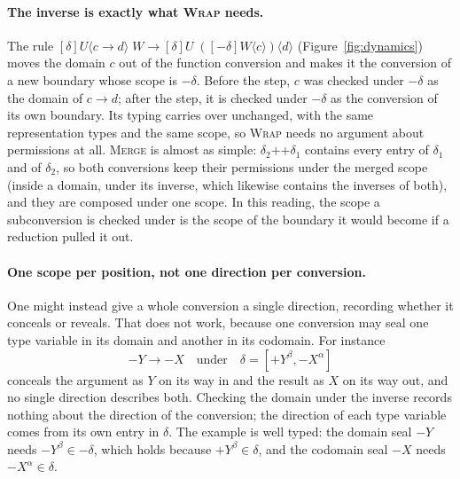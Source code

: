 \documentclass[acmsmall,screen,review,anonymous,nonacm]{acmart}
\newcommand{\dual}[1]{-#1}
\newcommand{\seal}[1]{-#1}
\newcommand{\becomes}{\longrightarrow}
\newcommand{\tu}{{\to}}
\newcommand{\app}{\;}
\newcommand{\boundry}[3]{\left[#2\right] #1 \langle #3 \rangle}
\begin{document}
\paragraph{The inverse is exactly what \textsc{Wrap} needs.}
The rule
$\boundry{U}{\delta}{c \tu d} \app W \becomes
 \boundry{U \app (\boundry{W}{\dual{\delta}}{c})}{\delta}{d}$
(Figure~\ref{fig:dynamics}) moves the domain $c$ out of the function
conversion and makes it the conversion of a new boundary whose scope is
$\dual{\delta}$.  Before the step, $c$ was checked under $\dual{\delta}$
as the domain of $c \tu d$; after the step, it is checked under
$\dual{\delta}$ as the conversion of its own boundary.  Its typing
carries over unchanged, with the same representation types and the same
scope, so \textsc{Wrap} needs no argument about permissions at all.
\textsc{Merge} is almost as simple: $\delta_2 \mathop{++} \delta_1$
contains every entry of $\delta_1$ and of $\delta_2$, so both
conversions keep their permissions under the merged scope (inside a
domain, under its inverse, which likewise contains the inverses of
both), and they are composed under one scope.  In this reading, the
scope a subconversion is checked under is the scope of the boundary it
would become if a reduction pulled it out.

\paragraph{One scope per position, not one direction per conversion.}
One might instead give a whole conversion a single direction, recording
whether it conceals or reveals.  That does not work, because one
conversion may seal one type variable in its domain and another in its
codomain.  For instance
\[
  \seal{Y} \tu \seal{X}
  \quad\text{under}\quad
  \delta = [{+Y}^\beta, {-X}^\alpha]
\]
conceals the argument as $Y$ on its way in and the result as $X$ on its
way out, and no single direction describes both.  Checking the domain
under the inverse records nothing about the direction of the
conversion; the direction of each type variable comes from its own
entry in $\delta$.  The example is well typed: the domain seal
$\seal{Y}$ needs ${-Y}^\beta \in \dual{\delta}$, which holds because
${+Y}^\beta \in \delta$, and the codomain seal $\seal{X}$ needs
${-X}^\alpha \in \delta$.
\end{document}
